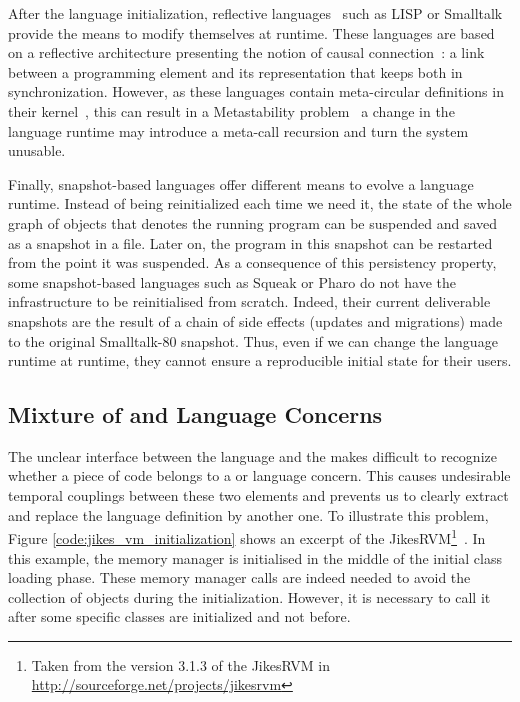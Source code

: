 After the language initialization, reflective languages~\cite{Smit84a} such as LISP or Smalltalk provide the means to modify themselves at runtime. These languages are based on a reflective architecture presenting the notion of causal connection~\cite{Maes87a}: a link between a programming element and its representation that keeps both in synchronization. However, as these languages contain meta-circular definitions in their kernel~\cite{Chib96a}, this can result in a Metastability problem~\cite{Kicz91a} \ie a change in the language runtime may introduce a meta-call recursion and turn the system unusable.%

Finally, snapshot-based languages offer different means to evolve a language runtime. Instead of being reinitialized each time we need it, the state of the whole graph of objects that denotes the running program can be suspended and saved as a snapshot in a file. Later on, the program in this snapshot can be restarted from the point it was suspended. As a consequence of this persistency property, some snapshot-based languages such as Squeak or Pharo  do not have the infrastructure to be reinitialised from scratch. Indeed, their current deliverable snapshots are the result of a chain of side effects (updates and migrations) made to the original Smalltalk-80 snapshot. Thus, even if we can change the language runtime at runtime, they cannot ensure a reproducible initial state for their users.

\subsection{Mixture of \VM and Language Concerns}

The unclear interface between the language and the \VM makes difficult to recognize whether a piece of code belongs to a \VM or language concern. This causes undesirable temporal couplings between these two elements and prevents us to clearly extract and replace the language definition by another one.
To illustrate this problem, Figure \ref{code:jikes_vm_initialization} shows an excerpt of the JikesRVM\footnote{Taken from the version 3.1.3 of the JikesRVM in \url{http://sourceforge.net/projects/jikesrvm}}~\cite{Alpe00a}. In this example, the memory manager is initialised in the middle of the initial class loading phase. These memory manager calls are indeed needed to avoid the collection of objects during the initialization. However, it is necessary to call it after some specific classes are initialized and not before.

